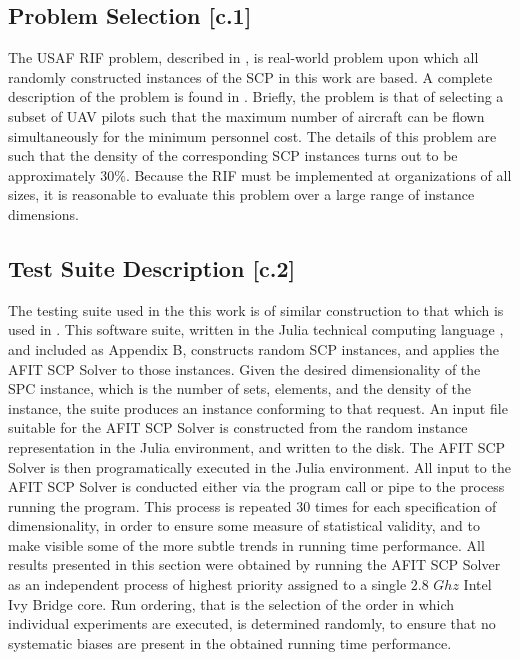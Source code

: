 \documentclass[12pt]{article}
\begin{document}
	\subsection{Problem Selection [c.1]} \label{scn:problem_selection}
	The USAF RIF problem, described in \cite{hw5_knapp_fletcher_csce_686}, is real-world problem upon which all randomly constructed instances of the SCP in this work are based. A complete description of the problem is found in \cite{hw5_knapp_fletcher_csce_686}. Briefly, the problem is that of selecting a subset of UAV pilots such that the maximum number of aircraft can be flown simultaneously for the minimum personnel cost. The details of this problem are such that the density of the corresponding SCP instances turns out to be approximately $30\%$. Because the RIF must be implemented at organizations of all sizes, it is reasonable to evaluate this problem over a large range of instance dimensions.
	
	\subsection{Test Suite Description [c.2]}
	
	The testing suite used in the this work is of similar construction to that which is used in \cite{hw5_knapp_fletcher_csce_686}. This software suite, written in the Julia technical computing language \cite{Julia}, and included as Appendix B, constructs random SCP instances, and applies the AFIT SCP Solver to those instances. Given the desired dimensionality of the SPC instance, which is the number of sets, elements, and the density of the instance, the suite produces an instance conforming to that request. An input file suitable for the AFIT SCP Solver is constructed from the random instance representation in the Julia environment, and written to the disk. The AFIT SCP Solver is then programatically executed in the Julia environment. All input to the AFIT SCP Solver is conducted either via the program call or pipe to the process running the program. This process is repeated $30$ times for each specification of dimensionality, in order to ensure some measure of statistical validity, and to make visible some of the more subtle trends in running time performance. All results presented in this section were obtained by running the AFIT SCP Solver as an independent process of highest priority assigned to a single $2.8$ $Ghz$ Intel Ivy Bridge core. Run ordering, that is the selection of the order in which individual experiments are executed, is determined randomly, to ensure that no systematic biases are present in the obtained running time performance.
	
\end{document}
